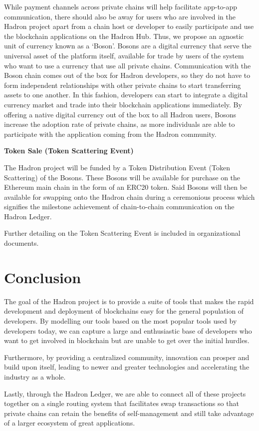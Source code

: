 \documentclass{%
	article}
\begin{document}
While payment channels across private chains will help facilitate app-to-app communication, there should also be away for users who are involved in the Hadron project apart from a chain host or developer to easily participate and use the blockchain applications on the Hadron Hub. Thus, we propose an agnostic unit of currency known as a ‘Boson’. Bosons are a digital currency that serve the universal asset of the platform itself, available for trade by users of the system who want to use a currency that use all private chains. Communication with the Boson chain comes out of the box for Hadron developers, so they do not have to form independent relationships with other private chains to start transferring assets to one another. In this fashion, developers can start to integrate a digital currency market and trade into their blockchain applications immediately. By offering a native digital currency out of the box to all Hadron users, Bosons increase the adoption rate of private chains, as more individuals are able to participate with the application coming from the Hadron community.

\begin{center}
\textbf{Token Sale (Token Scattering Event)}
\end{center}

The Hadron project will be funded by a Token Distribution Event (Token Scattering) of the Bosons. These Bosons will be available for purchase on the Ethereum main chain in the form of an ERC20 token. Said Bosons will then be available for swapping onto the Hadron chain during a ceremonious process which signifies the milestone achievement of chain-to-chain communication on the Hadron Ledger.

Further detailing on the Token Scattering Event is included in organizational documents.

\section{Conclusion}

The goal of the Hadron project is to provide a suite of tools that makes the rapid development and deployment of blockchains easy for the general population of developers. By modelling our tools based on the most popular tools used by developers today, we can capture a large and enthusiastic base of developers who want to get involved in blockchain but are unable to get over the initial hurdles.

Furthermore, by providing a centralized community, innovation can prosper and build upon itself, leading to newer and greater technologies and accelerating the industry as a whole.

Lastly, through the Hadron Ledger, we are able to connect all of these projects together on a single routing system that facilitates swap transactions so that private chains can retain the benefits of self-management and still take advantage of a larger ecosystem of great applications.

{}

\end{document}
